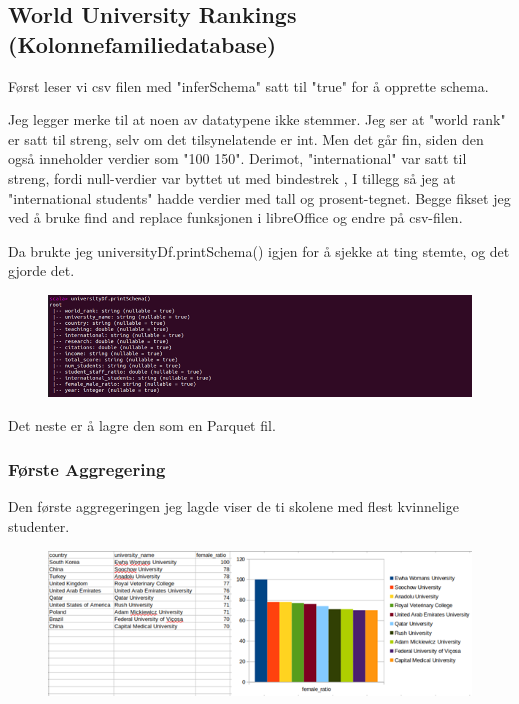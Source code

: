 \subsection{World University Rankings (Kolonnefamiliedatabase)}

Først leser vi csv filen med "inferSchema" satt til "true" for å opprette schema.

Jeg legger merke til at noen av datatypene ikke stemmer. Jeg ser at "world rank" er satt til streng, selv om det tilsynelatende er int. Men det går fin, siden den også inneholder verdier som "100 150". Derimot, "international" var satt til streng, fordi null-verdier var byttet ut med bindestrek , I tillegg så jeg at "international students" hadde verdier med tall og prosent-tegnet. Begge fikset jeg ved å bruke find and replace funksjonen i libreOffice og endre på csv-filen.

Da brukte jeg universityDf.printSchema() igjen for å sjekke at ting stemte, og det gjorde det.
\FigureCounter
\begin{figure}[H]
    \includegraphics[width=\textwidth]{images/milepael5/printSchema.png}
\end{figure}

Det neste er å lagre den som en Parquet fil.


\subsubsection{Første Aggregering}
Den første aggregeringen jeg lagde viser de ti skolene med flest kvinnelige studenter. 

\FigureCounter
\begin{figure}[H]
    \includegraphics[width=\textwidth]{images/milepael5/resUniFemRatio.png}
\end{figure}

